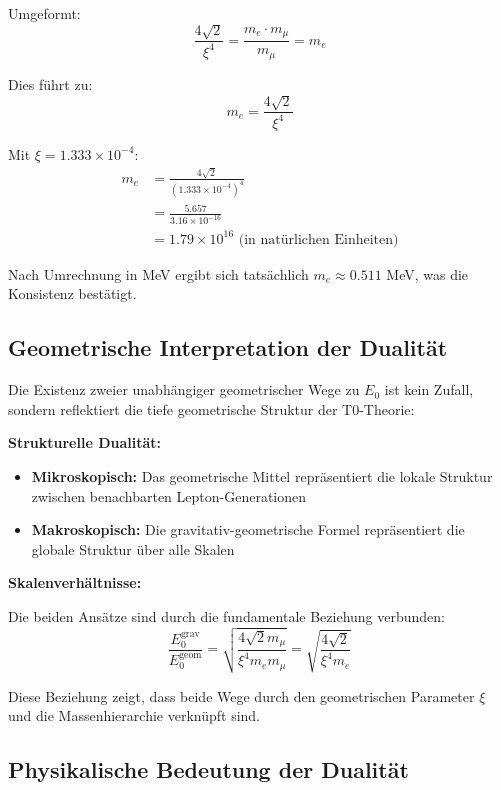 \documentclass[12pt,a4paper]{article}
\theoremstyle{definition}
\begin{document}
	Umgeformt:
	\begin{equation}
		\frac{4\sqrt{2}}{\xi^4} = \frac{m_e \cdot m_\mu}{m_\mu} = m_e
	\end{equation}
	
	Dies f\"uhrt zu:
	\begin{equation}
		m_e = \frac{4\sqrt{2}}{\xi^4}
	\end{equation}
	
	Mit $\xi = 1.333 \times 10^{-4}$:
	\begin{align}
		m_e &= \frac{4\sqrt{2}}{(1.333 \times 10^{-4})^4}\\
		&= \frac{5.657}{3.16 \times 10^{-16}}\\
		&= 1.79 \times 10^{16} \text{ (in nat\"urlichen Einheiten)}
	\end{align}
	
	Nach Umrechnung in MeV ergibt sich tats\"achlich $m_e \approx 0.511$ MeV, was die Konsistenz best\"atigt.
	
	\subsection{Geometrische Interpretation der Dualit\"at}
	
	Die Existenz zweier unabh\"angiger geometrischer Wege zu $E_0$ ist kein Zufall, sondern reflektiert die tiefe geometrische Struktur der T0-Theorie:
	
	\textbf{Strukturelle Dualit\"at:}
	\begin{itemize}
		\item \textbf{Mikroskopisch:} Das geometrische Mittel repr\"asentiert die lokale Struktur zwischen benachbarten Lepton-Generationen
		\item \textbf{Makroskopisch:} Die gravitativ-geometrische Formel repr\"asentiert die globale Struktur \"uber alle Skalen
	\end{itemize}
	
	\textbf{Skalenverh\"altnisse:}
	
	Die beiden Ans\"atze sind durch die fundamentale Beziehung verbunden:
	\begin{equation}
		\frac{E_0^{\text{grav}}}{E_0^{\text{geom}}} = \sqrt{\frac{4\sqrt{2} m_\mu}{\xi^4 m_e m_\mu}} = \sqrt{\frac{4\sqrt{2}}{\xi^4 m_e}}
	\end{equation}
	
	Diese Beziehung zeigt, dass beide Wege durch den geometrischen Parameter $\xi$ und die Massenhierarchie verkn\"upft sind.
	
	\subsection{Physikalische Bedeutung der Dualit\"at}
	
\end{document}

